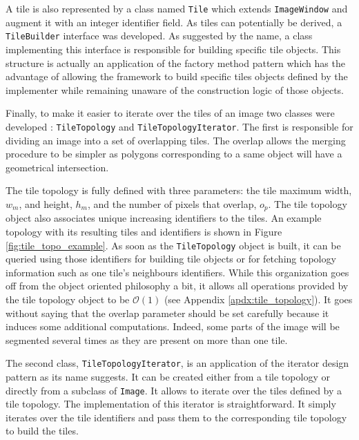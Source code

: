 A tile is also represented by a class named \texttt{Tile} which extends \texttt{ImageWindow} and augment it with an integer identifier field. As tiles can potentially be derived, a \texttt{TileBuilder} interface was developed. As suggested by the name, a class implementing this interface is responsible for building specific tile objects. This structure is actually an application of the factory method pattern which has the advantage of allowing the framework to build specific tiles objects defined by the implementer while remaining unaware of the construction logic of those objects.

Finally, to make it easier to iterate over the tiles of an image two classes were developed : \texttt{TileTopology} and \texttt{TileTopologyIterator}. The first is responsible for dividing an image into a set of overlapping tiles. The overlap allows the merging procedure to be simpler as polygons corresponding to a same object will have a geometrical intersection. 

The tile topology is fully defined with three parameters: the tile maximum width, $w_m$, and height, $h_m$, and the number of pixels that overlap, $o_p$. The tile topology object also associates unique increasing identifiers to the tiles. An example topology with its resulting tiles and identifiers is shown in Figure \ref{fig:tile_topo_example}. As soon as the \texttt{TileTopology} object is built, it can be queried using those identifiers for building tile objects or for fetching topology information such as one tile's neighbours identifiers. While this organization goes off from the object oriented philosophy a bit, it allows all operations provided by the tile topology object to be $\mathcal{O}(1)$ (see Appendix \ref{apdx:tile_topology}). It goes without saying that the overlap parameter should be set carefully because it induces some additional computations. Indeed, some parts of the image will be segmented several times as they are present on more than one tile. 

The second class, \texttt{TileTopologyIterator}, is an application of the iterator design pattern as its name suggests. It can be created either from a tile topology or directly from a subclass of \texttt{Image}. It allows to iterate over the tiles defined by a tile topology. The implementation of this iterator is straightforward. It simply iterates over the tile identifiers and pass them to the corresponding tile topology to build the tiles. 

